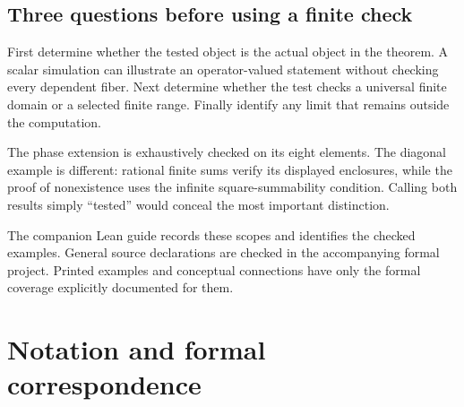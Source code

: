 \documentclass[11pt,oneside,openany]{book}
\newcommand{\chap}[1]{\section{#1}}
\numberwithin{equation}{section}
\begin{document}
\subsection{Three questions before using a finite check}
First determine whether the tested object is the actual object in the theorem. A scalar simulation can illustrate an operator-valued statement without checking every dependent fiber. Next determine whether the test checks a universal finite domain or a selected finite range. Finally identify any limit that remains outside the computation.

The phase extension is exhaustively checked on its eight elements. The diagonal example is different: rational finite sums verify its displayed enclosures, while the proof of nonexistence uses the infinite square-summability condition. Calling both results simply ``tested'' would conceal the most important distinction.

The companion Lean guide records these scopes and identifies the checked examples. General source declarations are checked in the accompanying formal project. Printed examples and conceptual connections have only the formal coverage explicitly documented for them.



\chap{Notation and formal correspondence}\label{KS:app:concordance}
\end{document}
